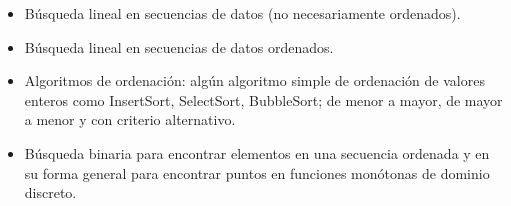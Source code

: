 \begin{itemize}
\item[\basic] Búsqueda lineal en secuencias de datos (no necesariamente ordenados).
\item[\basic] Búsqueda lineal en secuencias de datos ordenados.
\item[\advanced]
  Algoritmos de ordenación: algún algoritmo simple de ordenación de valores
  enteros como InsertSort, SelectSort, BubbleSort; de menor a mayor, de mayor a
  menor y con criterio alternativo.
\item[\advanced] Búsqueda binaria para encontrar elementos en una secuencia ordenada
  y en su forma general para encontrar puntos en funciones monótonas
  de dominio discreto.
\end{itemize}


